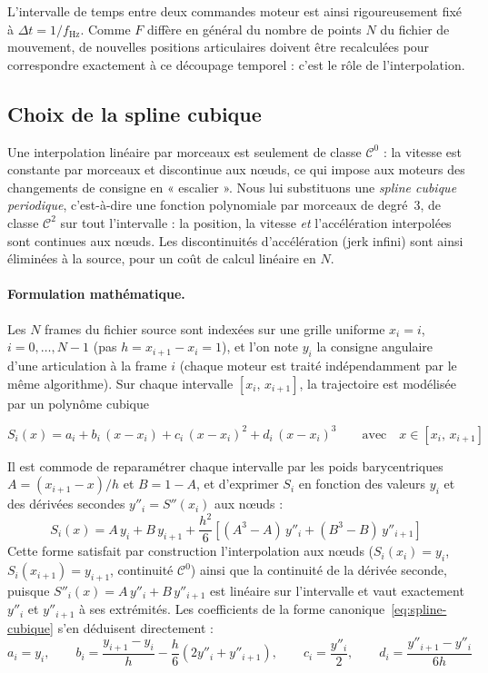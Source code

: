 \documentclass{tropLaClasse}
\begin{document}
L'intervalle de temps entre deux commandes moteur est ainsi rigoureusement fixé à $\Delta t = 1/f_{\mathrm{Hz}}$. Comme $F$ diffère en général du nombre de points $N$ du fichier de mouvement, de nouvelles positions articulaires doivent être recalculées pour correspondre exactement à ce découpage temporel : c'est le rôle de l'interpolation.

\subsection{Choix de la spline cubique}

Une interpolation linéaire par morceaux est seulement de classe $\mathcal{C}^0$ : la vitesse est constante par morceaux et discontinue aux nœuds, ce qui impose aux moteurs des changements de consigne en « escalier ». Nous lui substituons une \textit{spline cubique periodique}, c'est-à-dire une fonction polynomiale par morceaux de degré~3, de classe $\mathcal{C}^2$ sur tout l'intervalle : la position, la vitesse \emph{et} l'accélération interpolées sont continues aux nœuds. Les discontinuités d'accélération (jerk infini) sont ainsi éliminées à la source, pour un coût de calcul linéaire en $N$.

\paragraph{Formulation mathématique.} Les $N$ frames du fichier source sont indexées sur une grille uniforme $x_i = i$, $i = 0,\dots,N-1$ (pas $h = x_{i+1} - x_i = 1$), et l'on note $y_i$ la consigne angulaire d'une articulation à la frame $i$ (chaque moteur est traité indépendamment par le même algorithme). Sur chaque intervalle $[x_i,\, x_{i+1}]$, la trajectoire est modélisée par un polynôme cubique 

\begin{equation}
    S_i(x) = a_i + b_i\,(x - x_i) + c_i\,(x - x_i)^2 + d_i\,(x - x_i)^3
    \qquad \text{avec} \quad x \in [x_i,\, x_{i+1}]
    \label{eq:spline-cubique}
\end{equation}

Il est commode de reparamétrer chaque intervalle par les poids barycentriques $A = (x_{i+1} - x)/h$ et $B = 1 - A$, et d'exprimer $S_i$ en fonction des valeurs $y_i$ et des dérivées secondes $y''_i = S''(x_i)$ aux nœuds :
\begin{equation}
    S_i(x) = A\,y_i + B\,y_{i+1}
    + \frac{h^2}{6}\left[(A^3 - A)\,y''_i + (B^3 - B)\,y''_{i+1}\right]
    \label{eq:spline-nr}
\end{equation}
Cette forme satisfait par construction l'interpolation aux nœuds ($S_i(x_i) = y_i$, $S_i(x_{i+1}) = y_{i+1}$, continuité $\mathcal{C}^0$) ainsi que la continuité de la dérivée seconde, puisque $S''_i(x) = A\,y''_i + B\,y''_{i+1}$ est linéaire sur l'intervalle et vaut exactement $y''_i$ et $y''_{i+1}$ à ses extrémités. Les coefficients de la forme canonique~\eqref{eq:spline-cubique} s'en déduisent directement :
\begin{equation}
    a_i = y_i, \qquad
    b_i = \frac{y_{i+1} - y_i}{h} - \frac{h}{6}\left(2y''_i + y''_{i+1}\right), \qquad
    c_i = \frac{y''_i}{2}, \qquad
    d_i = \frac{y''_{i+1} - y''_i}{6h}
\end{equation}
\end{document}

